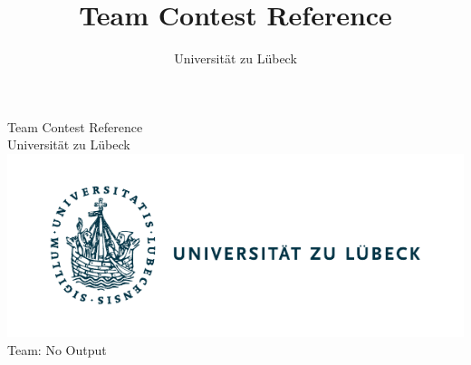 \documentclass[10pt,a4paper,ngerman,oneside,]{article}
\title{Team Contest Reference}
\author{Universität zu Lübeck}
\begin{document}
\lstset{basicstyle=\ttfamily\footnotesize,numbers=left,numberstyle=\tiny,tabsize=2,numbersep=5pt}
\begin{center}
	{\large Team Contest Reference}\\
	Universität zu Lübeck\\
	\includegraphics[scale=.8,clip,trim=.4cm 0cm 6.4cm 0cm,scale=0.89]{img/logo_uzl.pdf}\\
	Team: No Output
\end{center}
\end{document}

